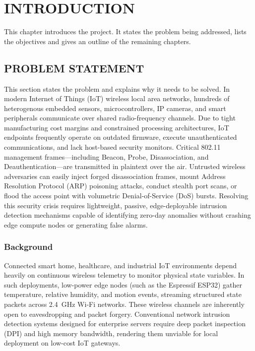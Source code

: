 \documentclass[11pt,a4paper]{report}
\begin{document}
\clearpage

\setcounter{page}{1}

\chapter{INTRODUCTION}
This chapter introduces the project. It states the problem being addressed, lists the objectives and gives an outline of the remaining chapters.

\section{PROBLEM STATEMENT}
This section states the problem and explains why it needs to be solved. In modern Internet of Things (IoT) wireless local area networks, hundreds of heterogenous embedded sensors, microcontrollers, IP cameras, and smart peripherals communicate over shared radio-frequency channels. Due to tight manufacturing cost margins and constrained processing architectures, IoT endpoints frequently operate on outdated firmware, execute unauthenticated communications, and lack host-based security monitors. Critical 802.11 management frames---including Beacon, Probe, Disassociation, and Deauthentication---are transmitted in plaintext over the air. Untrusted wireless adversaries can easily inject forged disassociation frames, mount Address Resolution Protocol (ARP) poisoning attacks, conduct stealth port scans, or flood the access point with volumetric Denial-of-Service (DoS) bursts. Resolving this security crisis requires lightweight, passive, edge-deployable intrusion detection mechanisms capable of identifying zero-day anomalies without crashing edge compute nodes or generating false alarms.

\subsection{Background}
Connected smart home, healthcare, and industrial IoT environments depend heavily on continuous wireless telemetry to monitor physical state variables. In such deployments, low-power edge nodes (such as the Espressif ESP32) gather temperature, relative humidity, and motion events, streaming structured state packets across 2.4~GHz Wi-Fi networks. These wireless channels are inherently open to eavesdropping and packet forgery. Conventional network intrusion detection systems designed for enterprise servers require deep packet inspection (DPI) and high memory bandwidth, rendering them unviable for local deployment on low-cost IoT gateways.
\end{document}
